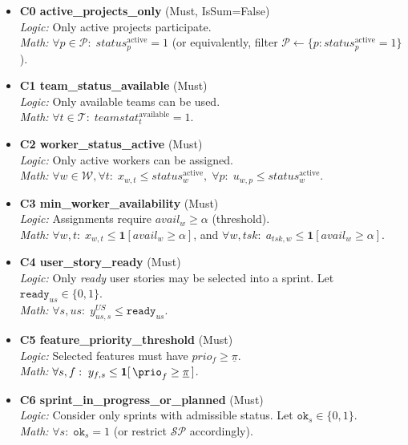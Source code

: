\documentclass[11pt,a4paper]{article}
\begin{document}
\begin{itemize}[leftmargin=2em]

  \item \textbf{C0 \; active\_projects\_only} (Must, IsSum=False)\\
  \emph{Logic:} Only active projects participate.\\
  \emph{Math:} $\forall p\in\mathcal{P}: \; status^\text{active}_p=1$ (or equivalently, filter $\mathcal{P}\leftarrow\{p:status^\text{active}_p=1\}$).

  \item \textbf{C1 \; team\_status\_available} (Must)\\
  \emph{Logic:} Only available teams can be used.\\
  \emph{Math:} $\forall t\in\mathcal{T}: \; teamstat^\text{available}_t=1$.

  \item \textbf{C2 \; worker\_status\_active} (Must)\\
  \emph{Logic:} Only active workers can be assigned.\\
  \emph{Math:} $\forall w\in\mathcal{W},\forall t:\; x_{w,t}\le status^\text{active}_w,\;\forall p:\; u_{w,p}\le status^\text{active}_w$.

  \item \textbf{C3 \; min\_worker\_availability} (Must)\\
  \emph{Logic:} Assignments require $avail_w\ge \alpha$ (threshold).\\
  \emph{Math:} $\forall w, t:\; x_{w,t}\le \mathbf{1}[avail_w\ge \alpha]$, and $\forall w,tsk:\; a_{tsk,w}\le \mathbf{1}[avail_w\ge \alpha]$.

  \item \textbf{C4 \; user\_story\_ready} (Must)\\
  \emph{Logic:} Only \emph{ready} user stories may be selected into a sprint. Let $\texttt{ready}_{us}\in\{0,1\}$.\\
  \emph{Math:} $\forall s,us:\; y^{US}_{us,s}\le \texttt{ready}_{us}$.

  \item \textbf{C5 \; feature\_priority\_threshold} (Must)\\
  \emph{Logic:} Selected features must have $prio_f\ge \underline{\pi}$.\\
  \emph{Math:} $\forall s,f:\; y_{f,s}\le \mathbf{1}[\,\prio_f\ge \underline{\pi}\,]$.

  \item \textbf{C6 \; sprint\_in\_progress\_or\_planned} (Must)\\
  \emph{Logic:} Consider only sprints with admissible status. Let $\texttt{ok}_s\in\{0,1\}$.\\
  \emph{Math:} $\forall s:\; \texttt{ok}_s=1$ (or restrict $\mathcal{S\!P}$ accordingly).


\end{itemize}
\end{document}

